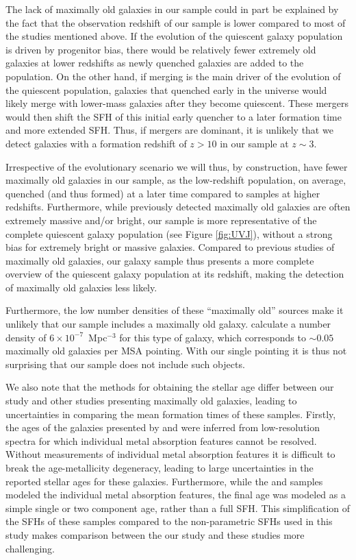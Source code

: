 \documentclass[twocolumn, astrosymb]{aastex631}
\begin{document}
The lack of maximally old galaxies in our sample could in part be explained by the fact that the observation redshift of our sample is lower compared to most of the studies mentioned above. If the evolution of the quiescent galaxy population is driven by progenitor bias, there would be relatively fewer extremely old galaxies at lower redshifts as newly quenched galaxies are added to the population. On the other hand, if merging is the main driver of the evolution of the quiescent population, galaxies that quenched early in the universe would likely merge with lower-mass galaxies after they become quiescent. These mergers would then shift the SFH of this initial early quencher to a later formation time and more extended SFH. Thus, if mergers are dominant, it is unlikely that we detect galaxies with a formation redshift of $z>10$ in our sample at $z\sim3$.

Irrespective of the evolutionary scenario we will thus, by construction, have fewer maximally old galaxies in our sample, as the low-redshift population, on average, quenched (and thus formed) at a later time compared to samples at higher redshifts. Furthermore, while previously detected maximally old galaxies are often extremely massive and/or bright, our sample is more representative of the complete quiescent galaxy population (see Figure \ref{fig:UVJ}), without a strong bias for extremely bright or massive galaxies. Compared to previous studies of maximally old galaxies, our galaxy sample thus presents a more complete overview of the quiescent galaxy population at its redshift, making the detection of maximally old galaxies less likely.

Furthermore, the low number densities of these ``maximally old'' sources make it unlikely that our sample includes a maximally old galaxy. \citet{KGlazebrook2023} calculate a number density of $6\times10^{-7}$~Mpc$^{-3}$ for this type of galaxy, which corresponds to $\sim0.05$ maximally old galaxies per MSA pointing. With our single pointing it is thus not surprising that our sample does not include such objects.

We also note that the methods for obtaining the stellar age differ between our study and other studies presenting maximally old galaxies, leading to uncertainties in comparing the mean formation times of these samples. Firstly, the ages of the galaxies presented by \citet{BForrest2020b, KGlazebrook2023, TNanayakkara2024} and \citet{DSetton2024} were inferred from low-resolution spectra for which individual metal absorption features cannot be resolved. Without measurements of individual metal absorption features it is difficult to break the age-metallicity degeneracy, leading to large uncertainties in the reported stellar ages for these galaxies. Furthermore, while the \citet{ABeverage2024} and \citet{MKriek2016} samples modeled the individual metal absorption features, the final age was modeled as a simple single or two component age, rather than a full SFH. This simplification of the SFHs of these samples compared to the non-parametric SFHs used in this study makes comparison between the our study and these studies more challenging. 
\end{document}

